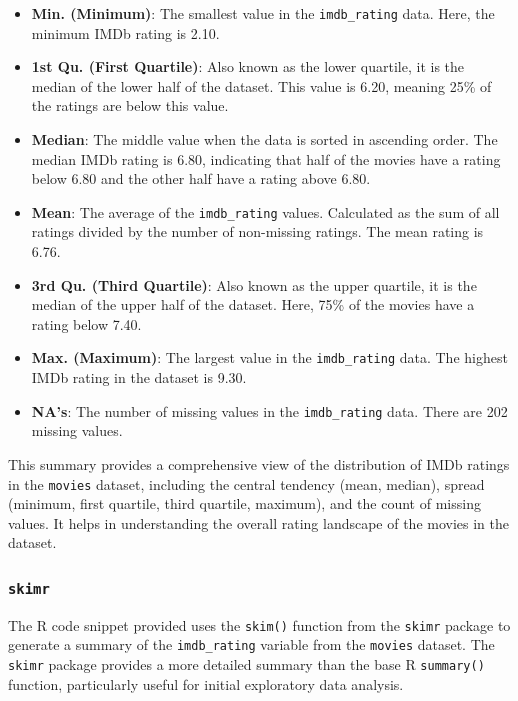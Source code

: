 \documentclass[
]{book}
\providecommand{\tightlist}{%
  \setlength{\itemsep}{0pt}\setlength{\parskip}{0pt}}
\begin{document}
\begin{itemize}
\tightlist
\item
  \textbf{Min. (Minimum)}: The smallest value in the \texttt{imdb\_rating} data. Here, the minimum IMDb rating is 2.10.
\item
  \textbf{1st Qu. (First Quartile)}: Also known as the lower quartile, it is the median of the lower half of the dataset. This value is 6.20, meaning 25\% of the ratings are below this value.
\item
  \textbf{Median}: The middle value when the data is sorted in ascending order. The median IMDb rating is 6.80, indicating that half of the movies have a rating below 6.80 and the other half have a rating above 6.80.
\item
  \textbf{Mean}: The average of the \texttt{imdb\_rating} values. Calculated as the sum of all ratings divided by the number of non-missing ratings. The mean rating is 6.76.
\item
  \textbf{3rd Qu. (Third Quartile)}: Also known as the upper quartile, it is the median of the upper half of the dataset. Here, 75\% of the movies have a rating below 7.40.
\item
  \textbf{Max. (Maximum)}: The largest value in the \texttt{imdb\_rating} data. The highest IMDb rating in the dataset is 9.30.
\item
  \textbf{NA's}: The number of missing values in the \texttt{imdb\_rating} data. There are 202 missing values.
\end{itemize}

This summary provides a comprehensive view of the distribution of IMDb ratings in the \texttt{movies} dataset, including the central tendency (mean, median), spread (minimum, first quartile, third quartile, maximum), and the count of missing values. It helps in understanding the overall rating landscape of the movies in the dataset.

\hypertarget{skimr}{%
\subsubsection*{\texorpdfstring{\texttt{skimr}}{skimr}}\label{skimr}}

The R code snippet provided uses the \texttt{skim()} function from the \texttt{skimr} package to generate a summary of the \texttt{imdb\_rating} variable from the \texttt{movies} dataset. The \texttt{skimr} package provides a more detailed summary than the base R \texttt{summary()} function, particularly useful for initial exploratory data analysis.
\end{document}
